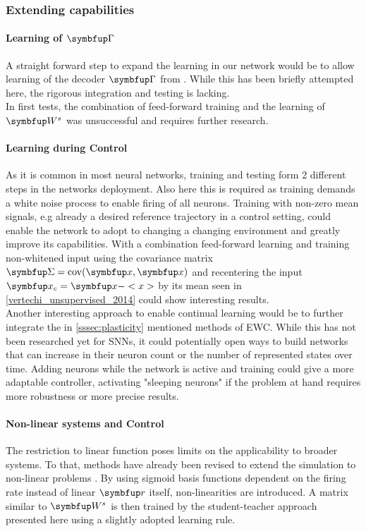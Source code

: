 \subsubsection{Extending capabilities}
\paragraph{Learning of $\bmu{\Gamma}$}
A straight forward step to expand the learning in our network would be to allow learning of the decoder $\bmu{\Gamma}$ from \cite{brendel_learning_2020}. While this has been briefly attempted here, the rigorous integration and testing is lacking.\\
In first tests, the combination of feed-forward training and the learning of $\bmu{W}^s$ was unsuccessful and requires further research.
\paragraph{Learning during Control}
As it is common in most neural networks, training and testing form 2 different steps in the networks deployment. Also here this is required as training demands a white noise process to enable firing of all neurons. Training with non-zero mean signals, e.g already a desired reference trajectory in a control setting, could enable the network to adopt to changing a changing environment and greatly improve its capabilities. With a combination feed-forward learning and training non-whitened input using the covariance matrix $\bmu{\Sigma} = \text{cov}(\bmu{x},\bmu{x})$ and recentering the input $\bmu{x
}_c = \bmu{x} - <x>$ by its mean seen in \cref{vertechi_unsupervised_2014} could show interesting results.\\
Another interesting approach to enable continual learning would be to further integrate the in \cref{sssec:plasticity} mentioned methods of \ac{EWC}. While this has not been researched yet for \acp{SNN}, it could potentially open ways to build networks that can increase in their neuron count or the number of represented states over time. Adding neurons while the network is active and training could give a more adaptable controller, activating "sleeping neurons" if the problem at hand requires more robustness or more precise results.\\

\paragraph{Non-linear systems and Control}
The restriction to linear function poses limits on the applicability to broader systems. To that, methods have already been revised to extend the simulation to non-linear problems \cite{alemi_learning_2017}. By using sigmoid basis functions dependent on the firing rate instead of linear $\bmu{r}$ itself, non-linearities are introduced. A matrix similar to $\bmu{W}^s$ is then trained by the student-teacher approach presented here using a slightly adopted learning rule.


